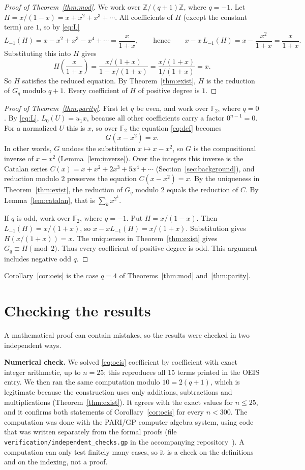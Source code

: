\documentclass[11pt,a4paper]{article}
\theoremstyle{definition}
\theoremstyle{remark}
\newcommand{\Z}{\mathbb{Z}}
\newcommand{\F}{\mathbb{F}}
\newcommand{\para}[1]{\par\medskip\noindent\textbf{#1}\enspace}
\begin{document}
\begin{proof}[Proof of Theorem~\ref{thm:mod}]
We work over $\Z/(q+1)\Z$, where $q=-1$. Let $H=x/(1-x)=x+x^2+x^3+\cdots$. All coefficients of $H$ (except the
constant term) are $1$, so by \eqref{eq:L}
\[
L_{-1}(H)=x-x^2+x^3-x^4+\cdots=\frac{x}{1+x},
\qquad\text{hence}\qquad
x-x\,L_{-1}(H)=x-\frac{x^2}{1+x}=\frac{x}{1+x}.
\]
Substituting this into $H$ gives
\[
H\!\left(\frac{x}{1+x}\right)=\frac{x/(1+x)}{1-x/(1+x)}=\frac{x/(1+x)}{1/(1+x)}=x .
\]
So $H$ satisfies the reduced equation. By Theorem~\ref{thm:exist}, $H$ is the reduction of $G_q$ modulo $q+1$. Every
coefficient of $H$ of positive degree is $1$.
\end{proof}

\begin{proof}[Proof of Theorem~\ref{thm:parity}]
First let $q$ be even, and work over $\F_2$, where $q=0$. By \eqref{eq:L}, $L_0(U)=u_1x$, because all other
coefficients carry a factor $0^{n-1}=0$. For a normalized $U$ this is $x$, so over $\F_2$ the equation
\eqref{eq:def} becomes
\[
G(x-x^2)=x .
\]
In other words, $G$ undoes the substitution $x\mapsto x-x^2$, so $G$ is the compositional inverse of $x-x^2$
(Lemma~\ref{lem:inverse}). Over the integers this inverse is the Catalan series $C(x)=x+x^2+2x^3+5x^4+\cdots$
(Section~\ref{sec:background}), and reduction modulo $2$ preserves the equation $C(x-x^2)=x$. By the uniqueness in
Theorem~\ref{thm:exist}, the reduction of $G_q$ modulo $2$ equals the reduction of $C$. By Lemma~\ref{lem:catalan}, that
is $\sum_kx^{2^k}$.

If $q$ is odd, work over $\F_2$, where $q=-1$. Put $H=x/(1-x)$.
Then $L_{-1}(H)=x/(1+x)$, so $x-xL_{-1}(H)=x/(1+x)$.
Substitution gives $H(x/(1+x))=x$.
The uniqueness in Theorem~\ref{thm:exist} gives $G_q\equiv H\pmod2$.
Thus every coefficient of positive degree is odd. This argument includes negative odd $q$.
\end{proof}

Corollary~\ref{cor:oeis} is the case $q=4$ of Theorems~\ref{thm:mod} and~\ref{thm:parity}.

\section{Checking the results}\label{sec:checks}

A mathematical proof can contain mistakes, so the results were checked in two independent ways.

\para{Numerical check.}
We solved \eqref{eq:oeis} coefficient by coefficient with exact integer arithmetic, up to $n=25$; this
reproduces all 15 terms printed in the OEIS entry. We then ran the same computation
modulo $10=2(q+1)$, which is legitimate because the construction uses only additions,
subtractions and multiplications (Theorem~\ref{thm:exist}). It agrees with the exact values for $n\le25$, and it confirms
both statements of Corollary~\ref{cor:oeis} for every $n<300$.
The computation was done with the PARI/GP computer algebra system, using code that was written separately from the
formal proofs (file \texttt{verification/independent\_checks.gp} in the accompanying repository~\cite{repo}).
A computation can only test finitely many cases, so it is a check on the definitions and on the indexing, not a proof.
\end{document}
